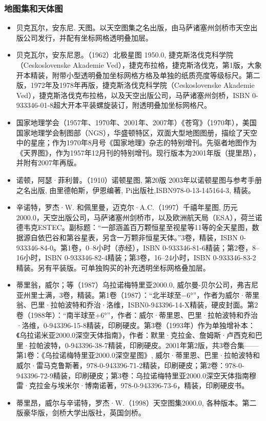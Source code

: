 \subsubsection{地图集和天体图}
\begin{itemize}
\item 贝克瓦尔，安东尼. 天图。以天空图集之名出版，由马萨诸塞州剑桥市天空出版公司发行，并配有坐标网格透明叠加层。
\item 贝克瓦尔，安东尼恩。（1962）北极星图 1950.0, 捷克斯洛伐克科学院（Ceskoslovenske Akademie Ved），捷克布拉格，捷克斯洛伐克，第1版，大象开本精装，附带小型透明叠加坐标网格方格及单独的纸质亮度等级标尺。第二版，1972年及1978年再版，捷克斯洛伐克科学院（Ceskoslovenske Akademie Ved），捷克斯洛伐克布拉格，以及天空出版公司，马萨诸塞州剑桥，ISBN 0-933346-01-8超大开本平装螺旋装订，附透明叠加坐标网格尺。
\item 国家地理学会（1957年、1970年、2001年、2007年）《苍穹》（1970年），美国国家地理学会制图部（NGS），华盛顿特区，双面大型地图图册，描绘了天空中的星座；作为1970年8月号《国家地理》杂志的特别增刊。先驱者地图作为《天界图》，作为1957年12月刊的特别增刊。现行版本为2001年版（提里昂），并附有2007年再版。
\item 诺顿，阿瑟·菲利普。（1910）诺顿星图, 第20版 2003年以诺顿星图与参考手册之名出版, 由里德帕斯，伊恩编著, Pi出版社,ISBN978-0-13-145164-3, 精装。
\item 辛诺特，罗杰·W. 和佩里曼，迈克尔·A.C.（1997）千禧年星图, 历元2000.0，天空出版公司，马萨诸塞州剑桥市，以及欧洲航天局（ESA），荷兰诺德韦克ESTEC。副标题：“一部涵盖百万颗恒星至视星等11等的全天星图，数据源自依巴谷和第谷星表，另含一万颗非恒星天体。”3卷，精装，ISBN 0-933346-84-0。第1卷，0–8小时（赤经），ISBN 0-933346-81-6精装；第2卷，8–16小时，ISBN 0-933346-82-4精装；第3卷，16–24小时，ISBN 0-933346-83-2精装。另有平装版。可单独购买的补充透明坐标网格叠加层。
\item 蒂里翁，威尔；等（1987）乌拉诺梅特里亚2000.0, 威尔曼-贝尔公司，弗吉尼亚州里士满，3卷，精装。第1卷（1987）：“北半球至−6°”，作者为威尔·蒂里翁、巴里·拉帕波特和乔治·洛维，ISBN0-943396-14-X精装，硬皮封面。第2卷（1988年）：“南半球至+6°”，作者：威尔·蒂里恩、巴里·拉帕波特和乔治·洛维，0-943396-15-8精装，印刷硬皮。第3卷（1993年）作为单独增补本：《乌拉诺米亚2000.0深空天体指南》，作者：默里·克拉金、詹姆斯·卢西克和巴里·拉帕波特，0-943396-38-7精装，印刷硬皮。2001年第2版，共3卷合集——第1卷：《乌拉诺梅特里亚2000.0深空星图》, 威尔·蒂里恩、巴里·拉帕波特和威尔·雷马克鲁斯著，978-0-943396-71-2精装，印刷硬皮；第2卷：978-0-943396-72-9精装，印刷硬皮；第3卷：乌拉诺梅特里亚2000.0深空天体指南穆雷·克拉金与埃米尔·博南诺著，978-0-943396-73-6，精装，印刷硬皮书。
\item 蒂里昂，威尔与辛诺特，罗杰·W.（1998）天空图集2000.0, 各种版本。第二版豪华版，剑桥大学出版社，英国剑桥。
\end{itemize}
